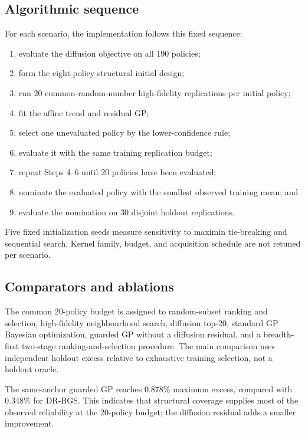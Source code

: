 \documentclass[futureinternet,supfile,submit,moreauthors]{Definitions/mdpi}
\begin{document}
\subsection{Algorithmic sequence}

For each scenario, the implementation follows this fixed sequence:

\begin{enumerate}
\item evaluate the diffusion objective on all 190 policies;
\item form the eight-policy structural initial design;
\item run 20 common-random-number high-fidelity replications per initial policy;
\item fit the affine trend and residual GP;
\item select one unevaluated policy by the lower-confidence rule;
\item evaluate it with the same training replication budget;
\item repeat Steps 4--6 until 20 policies have been evaluated;
\item nominate the evaluated policy with the smallest observed training mean; and
\item evaluate the nomination on 30 disjoint holdout replications.
\end{enumerate}

Five fixed initialization seeds measure sensitivity to maximin tie-breaking
and sequential search. Kernel family, budget, and acquisition schedule are not
retuned per scenario.

\subsection{Comparators and ablations}

The common 20-policy budget is assigned to random-subset ranking and
selection, high-fidelity neighbourhood search, diffusion top-20, standard GP
Bayesian optimization, guarded GP without a diffusion residual, and a
breadth-first two-stage ranking-and-selection procedure. The main comparison
uses independent holdout excess relative to exhaustive training selection,
not a holdout oracle.

The same-anchor guarded GP reaches 0.878\% maximum excess, compared with
0.348\% for DR-BGS. This indicates that structural coverage supplies most of
the observed reliability at the 20-policy budget; the diffusion residual adds
a smaller improvement.
\end{document}
